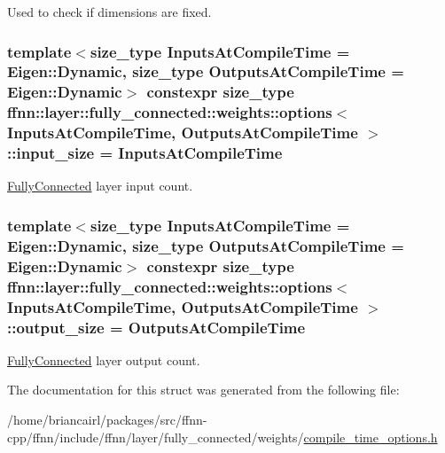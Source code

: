 Used to check if dimensions are fixed. 

\hypertarget{structffnn_1_1layer_1_1fully__connected_1_1weights_1_1options_aa9973b3dcef51f2684f3c36bbeccd767}{
\subsubsection[{input\-\_\-size}]{\setlength{\rightskip}{0pt plus 5cm}template$<$size\-\_\-type Inputs\-At\-Compile\-Time = Eigen\-::\-Dynamic, size\-\_\-type Outputs\-At\-Compile\-Time = Eigen\-::\-Dynamic$>$ constexpr {\bf size\-\_\-type} {\bf ffnn\-::layer\-::fully\-\_\-connected\-::weights\-::options}$<$ Inputs\-At\-Compile\-Time, Outputs\-At\-Compile\-Time $>$\-::input\-\_\-size = Inputs\-At\-Compile\-Time\hspace{0.3cm}{\ttfamily [static]}}}\label{structffnn_1_1layer_1_1fully__connected_1_1weights_1_1options_aa9973b3dcef51f2684f3c36bbeccd767}


\hyperlink{classffnn_1_1layer_1_1_fully_connected}{Fully\-Connected} layer input count. 

\hypertarget{structffnn_1_1layer_1_1fully__connected_1_1weights_1_1options_a45dac283a1611df3497baf255d8645c1}{
\subsubsection[{output\-\_\-size}]{\setlength{\rightskip}{0pt plus 5cm}template$<$size\-\_\-type Inputs\-At\-Compile\-Time = Eigen\-::\-Dynamic, size\-\_\-type Outputs\-At\-Compile\-Time = Eigen\-::\-Dynamic$>$ constexpr {\bf size\-\_\-type} {\bf ffnn\-::layer\-::fully\-\_\-connected\-::weights\-::options}$<$ Inputs\-At\-Compile\-Time, Outputs\-At\-Compile\-Time $>$\-::output\-\_\-size = Outputs\-At\-Compile\-Time\hspace{0.3cm}{\ttfamily [static]}}}\label{structffnn_1_1layer_1_1fully__connected_1_1weights_1_1options_a45dac283a1611df3497baf255d8645c1}


\hyperlink{classffnn_1_1layer_1_1_fully_connected}{Fully\-Connected} layer output count. 



The documentation for this struct was generated from the following file\-:\begin{DoxyCompactItemize}
\item 
/home/briancairl/packages/src/ffnn-\/cpp/ffnn/include/ffnn/layer/fully\-\_\-connected/weights/\hyperlink{fully__connected_2weights_2compile__time__options_8h}{compile\-\_\-time\-\_\-options.\-h}\end{DoxyCompactItemize}
